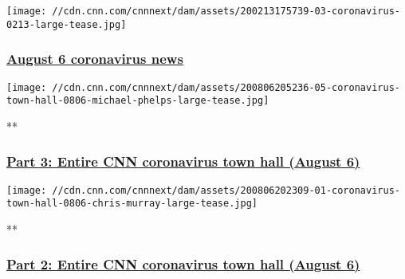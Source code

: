 \href{/world/live-news/coronavirus-pandemic-08-06-20-intl/index.html}{}

\texttt{[image: //cdn.cnn.com/cnnnext/dam/assets/200213175739-03-coronavirus-0213-large-tease.jpg]}

\hypertarget{august-6-coronavirus-news}{%
\subsubsection{\texorpdfstring{\href{/world/live-news/coronavirus-pandemic-08-06-20-intl/index.html}{August
6 coronavirus
news}}{August 6 coronavirus news}}\label{august-6-coronavirus-news}}

\href{/videos/health/2020/08/06/entire-august-6-coronavirus-town-hall-part-3-sot-vpx.cnn}{}

\texttt{[image: //cdn.cnn.com/cnnnext/dam/assets/200806205236-05-coronavirus-town-hall-0806-michael-phelps-large-tease.jpg]}

**

\hypertarget{part-3-entire-cnn-coronavirus-town-hall-august-6}{%
\subsubsection{\texorpdfstring{\href{/videos/health/2020/08/06/entire-august-6-coronavirus-town-hall-part-3-sot-vpx.cnn}{Part
3: Entire CNN coronavirus town hall (August
6)}}{Part 3: Entire CNN coronavirus town hall (August 6)}}\label{part-3-entire-cnn-coronavirus-town-hall-august-6}}

\href{/videos/health/2020/08/06/entire-august-6-coronavirus-town-hall-part-2-sot-vpx.cnn}{}

\texttt{[image: //cdn.cnn.com/cnnnext/dam/assets/200806202309-01-coronavirus-town-hall-0806-chris-murray-large-tease.jpg]}

**

\hypertarget{part-2-entire-cnn-coronavirus-town-hall-august-6}{%
\subsubsection{\texorpdfstring{\href{/videos/health/2020/08/06/entire-august-6-coronavirus-town-hall-part-2-sot-vpx.cnn}{Part
2: Entire CNN coronavirus town hall (August
6)}}{Part 2: Entire CNN coronavirus town hall (August 6)}}\label{part-2-entire-cnn-coronavirus-town-hall-august-6}}

\href{/videos/health/2020/08/06/entire-august-6-coronavirus-town-hall-part-4-sot-vpx.cnn}{}

